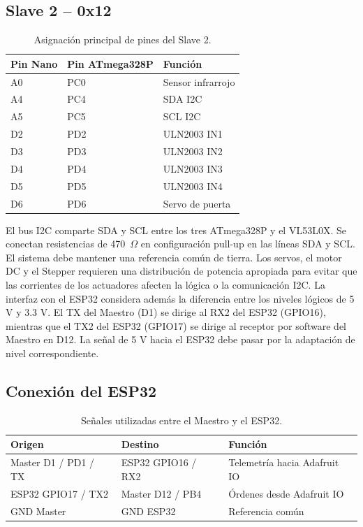 \subsection{Slave 2 -- 0x12}
\begin{table}[H]
\centering
\small
\begin{tabular}{lll}
\toprule
Pin Nano & Pin ATmega328P & Función \\
\midrule
A0 & PC0 & Sensor infrarrojo \\
A4 & PC4 & SDA I2C \\
A5 & PC5 & SCL I2C \\
D2 & PD2 & ULN2003 IN1 \\
D3 & PD3 & ULN2003 IN2 \\
D4 & PD4 & ULN2003 IN3 \\
D5 & PD5 & ULN2003 IN4 \\
D6 & PD6 & Servo de puerta \\
\bottomrule
\end{tabular}
\caption{Asignación principal de pines del Slave 2.}
\end{table}

El bus I2C comparte SDA y SCL entre los tres ATmega328P y el VL53L0X. Se conectan resistencias de 470~\(\Omega\) en configuración pull-up en las líneas SDA y SCL. El sistema debe mantener una referencia común de tierra. Los servos, el motor DC y el Stepper requieren una distribución de potencia apropiada para evitar que las corrientes de los actuadores afecten la lógica o la comunicación I2C. La interfaz con el ESP32 considera además la diferencia entre los niveles lógicos de 5 V y 3.3 V. El TX del Maestro (D1) se dirige al RX2 del ESP32 (GPIO16), mientras que el TX2 del ESP32 (GPIO17) se dirige al receptor por software del Maestro en D12. La señal de 5 V hacia el ESP32 debe pasar por la adaptación de nivel correspondiente.


\subsection{Conexión del ESP32}
\begin{table}[H]
\centering
\caption{Señales utilizadas entre el Maestro y el ESP32.}
\begin{tabular}{lll}
\toprule
Origen & Destino & Función \\
\midrule
Master D1 / PD1 / TX & ESP32 GPIO16 / RX2 & Telemetría hacia Adafruit IO \\
ESP32 GPIO17 / TX2 & Master D12 / PB4 & Órdenes desde Adafruit IO \\
GND Master & GND ESP32 & Referencia común \\
\bottomrule
\end{tabular}
\end{table}
